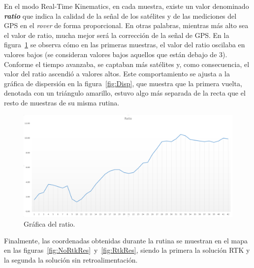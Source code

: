 En el modo Real-Time Kinematics, en cada muestra, existe un valor denominado \textit{\textbf{ratio}} que indica la calidad de la señal de los satélites y de las mediciones del GPS en el \textit{rover} de forma proporcional. En otras palabras, mientras más alto sea el valor de ratio, mucha mejor será la corrección de la señal de GPS. En la figura~\ref{fig:Ratio} se observa cómo en las primeras muestras, el valor del ratio oscilaba en valores bajos (se consideran valores bajos aquellos que están debajo de 3). Conforme el tiempo avanzaba, se captaban más satélites y, como consecuencia, el valor del ratio ascendió a valores altos. Este comportamiento se ajusta a la gráfica de dispersión en la figura~\ref{fig:Disp}, que muestra que la primera vuelta, denotada con un triángulo amarillo, estuvo algo más separada de la recta que el resto de muestras de su misma rutina.

\begin{figure}[H]
\centering
\includegraphics[scale=0.45]{Figures/Ratio}
\caption[Gráfica del ratio.]{Gráfica del ratio.}
\label{fig:Ratio}
\end{figure}

Finalmente, las coordenadas obtenidas durante la rutina se muestran en el mapa en las figuras~\ref{fig:NoRtkRes}~y~\ref{fig:RtkRes}, siendo la primera la solución RTK y la segunda la solución sin retroalimentación.

